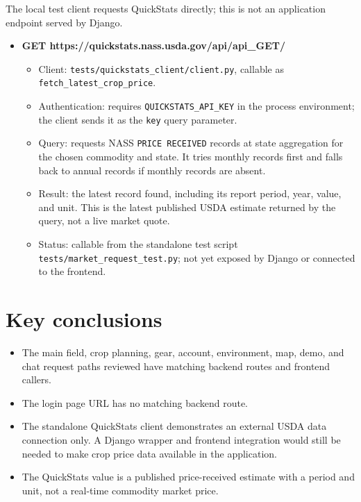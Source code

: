 \documentclass[11pt]{article}
\begin{document}
The local test client requests QuickStats directly; this is not an application endpoint served by Django.

\begin{itemize}[leftmargin=1.5em, itemsep=0.55em]

\item \textbf{GET https://quickstats.nass.usda.gov/api/api\_GET/}
  \begin{itemize}[leftmargin=1.5em, itemsep=0.2em]
    \item Client: \texttt{tests/quickstats\_client/client.py}, callable as \texttt{fetch\_latest\_crop\_price}.
    \item Authentication: requires \texttt{QUICKSTATS\_API\_KEY} in the process environment; the client sends it as the \texttt{key} query parameter.
    \item Query: requests NASS \texttt{PRICE RECEIVED} records at state aggregation for the chosen commodity and state. It tries monthly records first and falls back to annual records if monthly records are absent.
    \item Result: the latest record found, including its report period, year, value, and unit. This is the latest published USDA estimate returned by the query, not a live market quote.
    \item Status: callable from the standalone test script \texttt{tests/market\_request\_test.py}; not yet exposed by Django or connected to the frontend.
  \end{itemize}

\end{itemize}

\section*{Key conclusions}

\begin{itemize}[leftmargin=1.5em, itemsep=0.5em]
\item The main field, crop planning, gear, account, environment, map, demo, and chat request paths reviewed have matching backend routes and frontend callers.
\item The login page URL has no matching backend route.
\item The standalone QuickStats client demonstrates an external USDA data connection only. A Django wrapper and frontend integration would still be needed to make crop price data available in the application.
\item The QuickStats value is a published price-received estimate with a period and unit, not a real-time commodity market price.
\end{itemize}
\end{document}
